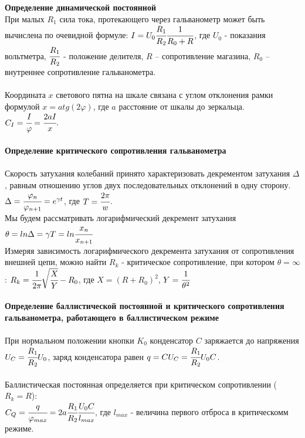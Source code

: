 \documentclass[11pt,a4paper]{article}
\begin{document}
\textbf{Определение динамической постоянной}\\

При малых $R_1$ сила тока, протекающего через гальванометр может быть вычислена по очевидной формуле: $I = U_0 \cfrac{R_1}{R_2} \cfrac{1}{R_0 + R}$, где $U_0$ - показания вольтметра, $\cfrac{R_1}{R_2}$ - положение делителя, $R$ -- сопротивление магазина, $R_0$ -- внутреннее сопротивление гальванометра.\\
\\
Координата $x$ светового пятна на шкале связана с углом отклонения рамки формулой $x = a tg(2 \varphi)$, где $a$ расстояние от шкалы до зеркальца. $C_I =\cfrac{I}{\varphi} = \cfrac{2aI}{x}.$\\
\\

\textbf{Определение критического сопротивления гальванометра}\\
\\
Скорость затухания колебаний принято характеризовать декрементом затухания $\Delta$, равным отношению углов двух последовательных отклонений в одну сторону. $\Delta = \cfrac{\varphi_n}{\varphi_{n+1}} = e^{\gamma t}$, где $T = \cfrac{2 \pi}{w}$.\\
Мы будем рассматривать логарифмический декремент затухания $\theta = ln \Delta = \gamma T = ln \cfrac{x_n}{x_{n+1}}$\\
Измеряя зависимость логарифмического декремента затухания от сопротивления внешней цепи, можно найти $R_k$ - критическое сопротивление,  при котором $\theta = \infty$ : $R_k = \cfrac{1}{2 \pi} \sqrt{\cfrac{X}{Y}} - R_0$, где $X = (R + R_0)^2$, $Y = \cfrac{1}{\theta^2}$
\\
\\
\textbf{Определение баллистической постоянной и критического сопротивления гальванометра, работающего в баллистическом режиме}\\
\\
При нормальном положении кнопки $K_0$ конденсатор $C$ заряжается до напряжения $U_C = \cfrac{R_1}{R_2}U_0$, заряд конденсатора равен $q = C U_C = \cfrac{R_1}{R_2}U_0 C$.\\
\\
Баллистическая постоянная определяется при критическом сопротивлении ($R_k= R$):\\ $C_Q = \cfrac{q}{\varphi_{max}} = 2a \cfrac{R_1}{R_2} \cfrac{U_0C}{l_{max}}$, где $l_{max}$ - величина первого отброса в критическомм режиме.
\end{document}
